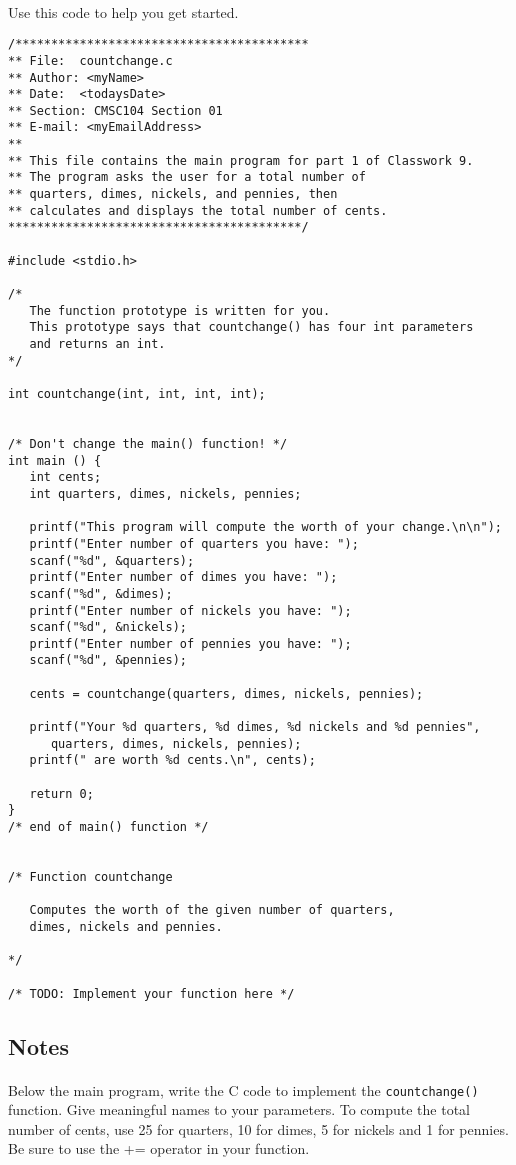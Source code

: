 \documentclass[letter,11pt]{article}
\begin{document}
\paragraph{}Use this code to help you get started.
\begin{verbatim}
/*****************************************
** File:  countchange.c
** Author: <myName>
** Date:  <todaysDate>
** Section: CMSC104 Section 01
** E-mail: <myEmailAddress>
**
** This file contains the main program for part 1 of Classwork 9.
** The program asks the user for a total number of 
** quarters, dimes, nickels, and pennies, then
** calculates and displays the total number of cents.
*****************************************/

#include <stdio.h>

/*
   The function prototype is written for you.
   This prototype says that countchange() has four int parameters
   and returns an int.
*/

int countchange(int, int, int, int);


/* Don't change the main() function! */
int main () {
   int cents;
   int quarters, dimes, nickels, pennies;

   printf("This program will compute the worth of your change.\n\n");
   printf("Enter number of quarters you have: ");
   scanf("%d", &quarters);
   printf("Enter number of dimes you have: ");
   scanf("%d", &dimes);
   printf("Enter number of nickels you have: ");
   scanf("%d", &nickels);
   printf("Enter number of pennies you have: ");
   scanf("%d", &pennies);

   cents = countchange(quarters, dimes, nickels, pennies);

   printf("Your %d quarters, %d dimes, %d nickels and %d pennies", 
      quarters, dimes, nickels, pennies);
   printf(" are worth %d cents.\n", cents);

   return 0;
}
/* end of main() function */


/* Function countchange
   
   Computes the worth of the given number of quarters,
   dimes, nickels and pennies.

*/

/* TODO: Implement your function here */
\end{verbatim}

\subsection*{Notes}
\paragraph{}Below the main program, write the C code to implement the \texttt{countchange()} function. Give meaningful names to your parameters. To compute the total number of cents, use 25 for quarters, 10 for dimes, 5 for nickels and 1 for pennies. Be sure to use the += operator in your function.
\end{document}
